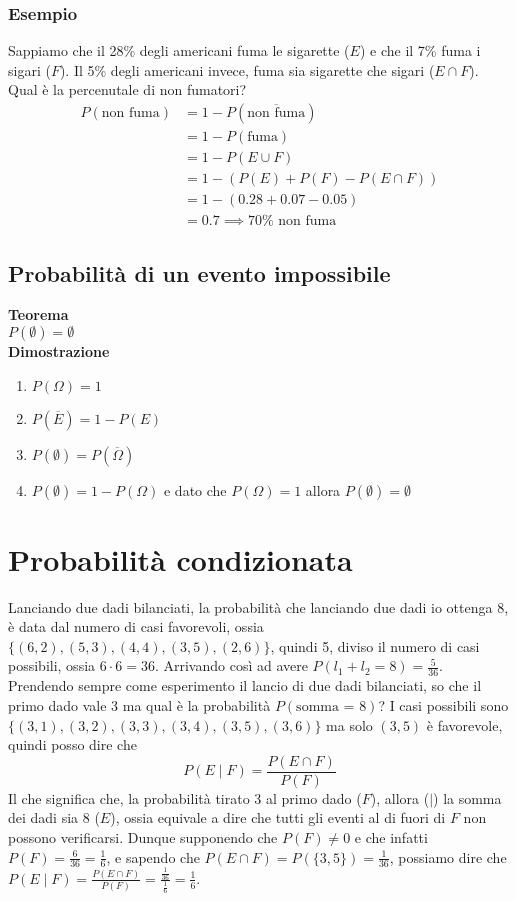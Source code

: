 \documentclass[11pt]{report}
\begin{document}
\subsubsection{Esempio}
Sappiamo che il 28\% degli americani fuma le sigarette ($E$) e che il 7\% fuma i sigari ($F$). Il 5\% degli americani invece, fuma sia sigarette che sigari ($E \cap F$). Qual è la percenutale di non fumatori?
\begin{equation}
    \begin{split}
        P(\text{non fuma}) & = 1 - P(\overline{\text{non fuma}})\\
        & = 1 - P(\text{fuma})\\
        & = 1 - P(E \cup F)\\
        & = 1 - (P(E) + P(F) - P(E \cap F))\\
        & = 1 - (0.28 + 0.07 - 0.05)\\
        & = 0.7 \implies 70\% \text{ non fuma}
    \end{split}
\end{equation}
\subsection{Probabilità di un evento impossibile}
\textbf{Teorema}\\
$P(\emptyset) = \emptyset$\\
\textbf{Dimostrazione}
\begin{enumerate}
	\item $P(\Omega) = 1$
	\item $P(\overline{E}) = 1 - P(E)$
	\item $P(\emptyset) = P(\overline{\Omega})$
	\item $P(\emptyset) = 1 - P(\Omega)$ e dato che $P(\Omega) = 1$ allora $P(\emptyset) = \emptyset$
\end{enumerate}

\section{Probabilità condizionata}
Lanciando due dadi bilanciati, la probabilità che lanciando due dadi io ottenga 8, è data dal numero di casi favorevoli, ossia $\{(6,2), (5,3), (4,4), (3,5), (2,6)\}$, quindi 5, diviso il numero di casi possibili, ossia $6 \cdot 6 = 36$. Arrivando così ad avere $P(l_1 + l_2 = 8) = \frac{5}{36}$.\\
Prendendo sempre come esperimento il lancio di due dadi bilanciati, so che il primo dado vale 3 ma qual è la probabilità $P(\text{somma = 8})$? I casi possibili sono $\{(3,1), (3,2), (3,3), (3,4), (3,5), (3,6)\}$ ma solo $(3,5)$ è favorevole, quindi posso dire che
\begin{equation}
    P(E \mid F) = \frac{P(E \cap F)}{P(F)}
\end{equation}
Il che significa che, la probabilità tirato 3 al primo dado ($F$), allora ($\mid$) la somma dei dadi sia 8 ($E$), ossia equivale a dire che tutti gli eventi al di fuori di $F$ non possono verificarsi. Dunque supponendo che $P(F) \neq 0$ e che infatti $P(F) = \frac{6}{36} = \frac{1}{6}$, e sapendo che $P(E \cap F) = P(\{3,5\}) = \frac{1}{36}$, possiamo dire che $P(E \mid F) = \frac{P(E \cap F)}{P(F)} = \frac{\frac{1}{36}}{\frac{1}{6}} = \frac{1}{6}$.
\end{document}

